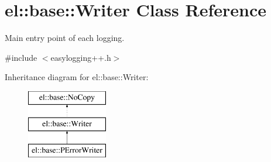 \hypertarget{classel_1_1base_1_1Writer}{\section{el\-:\-:base\-:\-:Writer Class Reference}
\label{classel_1_1base_1_1Writer}
}


Main entry point of each logging.  




{\ttfamily \#include $<$easylogging++.\-h$>$}

Inheritance diagram for el\-:\-:base\-:\-:Writer\-:\begin{figure}[H]
\begin{center}
\leavevmode
\includegraphics[height=3.000000cm]{classel_1_1base_1_1Writer}
\end{center}
\end{figure}
